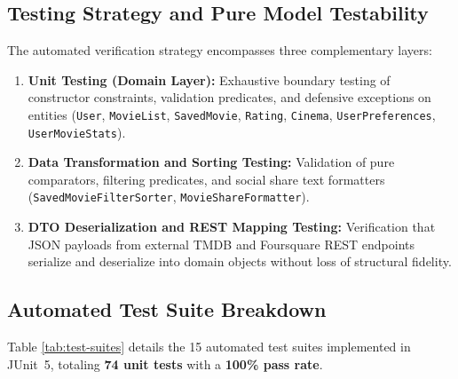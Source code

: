 \documentclass[runningheads,a4paper]{llncs}
\begin{document}
\subsection{Testing Strategy and Pure Model Testability}
The automated verification strategy encompasses three complementary layers:
\begin{enumerate}[label=\textbf{\arabic*.}]
    \item \textbf{Unit Testing (Domain Layer):} Exhaustive boundary testing of constructor constraints, validation predicates, and defensive exceptions on entities (\texttt{User}, \texttt{MovieList}, \texttt{SavedMovie}, \texttt{Rating}, \texttt{Cinema}, \texttt{UserPreferences}, \texttt{UserMovieStats}).
    \item \textbf{Data Transformation and Sorting Testing:} Validation of pure comparators, filtering predicates, and social share text formatters (\texttt{SavedMovieFilterSorter}, \texttt{MovieShareFormatter}).
    \item \textbf{DTO Deserialization and REST Mapping Testing:} Verification that JSON payloads from external TMDB and Foursquare REST endpoints serialize and deserialize into domain objects without loss of structural fidelity.
\end{enumerate}

\subsection{Automated Test Suite Breakdown}
Table \ref{tab:test-suites} details the 15 automated test suites implemented in JUnit~5, totaling \textbf{74 unit tests} with a \textbf{100\% pass rate}.
\end{document}
